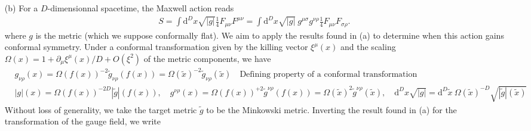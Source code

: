 \documentclass[10pt, a4paper]{article}
\begin{document}
{\begin{enumerate}
\begin{align*}
    &= F_{\mu \nu}(\tilde{x}) - F_{\mu \nu}(\tilde{x}) \frac{\Delta}{D}\partial_\lambda \xi^\lambda(\tilde{x}) - A_{(\nu}(\tilde{x}) \frac{\Delta}{D}\partial_{\mu)} \partial_\lambda \xi^\lambda(\tilde{x})  - (\partial_{(\mu} A_\lambda(\tilde{x}))M_{\nu)}{}^{\lambda} - \xi^{\lambda}(\tilde{x}) \partial_\lambda F_{\mu\nu}(\tilde{x}) - 2(\partial_{(\mu} \xi^{\lambda}(\tilde{x})) \partial_\lambda A_{\nu)}(\tilde{x})
  \end{align*}
  where we simplified further by expliciting 
  \begin{align*}
    & 2\partial_{(\mu} M_{\nu)}{}^{\lambda} = \partial_\mu\partial_\nu \xi^\lambda(\tilde{x}) - \partial_\mu\partial^\lambda \xi_\nu(\tilde{x}) - \partial_\nu \partial_\mu \xi^\lambda(\tilde{x}) - \partial_\nu \partial^\lambda \xi_\mu(\tilde{x}) = 0.
  \end{align*}
  We note that the transformation law of $F_{\mu\nu}$ involves $A_{\mu}$ homogeneously which is an example of mixing of CFT fields under the transformation of a descendant. 
  \item[(b)]   For a $D$-dimensionnal spacetime, the Maxwell action reads 
  \begin{align*}
    S = \int \text{d}^D x \sqrt{|g|} \frac{1}{4} F_{\mu\nu} F^{\mu \nu} = \int \text{d}^D x \sqrt{|g|} \ g^{\mu \sigma} g^{\nu \rho}\frac{1}{4} F_{\mu\nu} F_{\sigma \rho}.  
  \end{align*}
  where $g$ is the metric (which we suppose conformally flat). We aim to apply the results found in (a) to determine when this action gains conformal symmetry. Under a conformal transformation given by the killing vector $\xi^{\mu}(x)$ and the scaling $\Omega(x) = 1 + \partial_\mu \xi^\mu(x)/D + O(\xi^2)$ of the metric components, we have 
  \begin{align*}
    &g_{\nu \rho}(x) = \Omega(f(x))^{-2} \tilde{g}_{\nu \rho}(f(x)) = \Omega(\tilde{x})^{-2} \tilde{g}_{\nu \rho}(\tilde{x}) \quad \text{Defining property of a conformal transformation}\\
    &|g|(x) = \Omega(f(x))^{-2D} |\tilde{g}|(f(x)), \quad g^{\nu \rho}(x) = \Omega(f(x))^{+2} \tilde{g}^{\nu \rho}(f(x)) = \Omega(\tilde{x})^{2} \tilde{g}^{\nu \rho}(\tilde{x}), \quad  \text{d}^D x \sqrt{|g|} = \text{d}^D \tilde{x}\ \Omega(\tilde{x})^{-D} \sqrt{|\tilde{g}|(\tilde{x})}
  \end{align*}
  Without loss of generality, we take the target metric $\tilde{g}$ to be the Minkowski metric.
  Inverting the result found in (a) for the transformation of the gauge field, we write 

\end{enumerate}}
\end{document}
